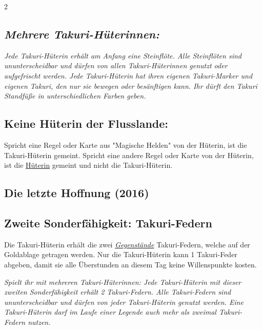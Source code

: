 \documentclass[10pt, a4paper, oneside]{book}
\newcommand{\fan}[1]{\textit{#1}}
\begin{document}
\begin{multicols*}{2}
\begin{nobgcolor}
\subsection{\fan{Mehrere Takuri-Hüterinnen:}}

\fan{Jede Takuri-Hüterin erhält am Anfang eine Steinflöte. Alle Steinflöten sind ununterscheidbar und dürfen von allen Takuri-Hüterinnen genutzt oder aufgefrischt werden. Jede Takuri-Hüterin hat ihren eigenen Takuri-Marker und eigenen Takuri, den nur sie bewegen oder besänftigen kann. Ihr dürft den Takuri Standfüße in unterschiedlichen Farben geben.}




\subsection{Keine Hüterin der Flusslande:}

Spricht eine Regel oder Karte aus "Magische Helden" von der Hüterin, ist die Takuri-Hüterin gemeint. Spricht eine andere Regel oder Karte von der Hüterin, ist die \hyperref[hueterin]{Hüterin} gemeint und nicht die Takuri-Hüterin.




\end{nobgcolor}




\begin{bgcolor}
\section{Die letzte Hoffnung (2016)}



\subsection{Zweite Sonderfähigkeit: Takuri-Federn}

Die Takuri-Hüterin erhält die zwei \hyperref[gegenstaende-und-sonderplaettchen]{\fan{Gegenstände}} Takuri-Federn, welche auf der Goldablage getragen werden. Nur die Takuri-Hüterin kann 1 Takuri-Feder abgeben, damit sie alle Überstunden an diesem Tag keine Willenspunkte kosten.
\supercite{mh11-heldenkarte-takuri-hueterin}

\fan{Spielt ihr mit mehreren Takuri-Hüterinnen: Jede Takuri-Hüterin mit dieser zweiten Sonderfähigkeit erhält 2 Takuri-Federn. Alle Takuri-Federn sind ununterscheidbar und dürfen von jeder Takuri-Hüterin genutzt werden. Eine Takuri-Hüterin darf im Laufe einer Legende auch mehr als zweimal Takuri-Federn nutzen.}



\end{bgcolor}
\end{multicols*}
\end{document}
